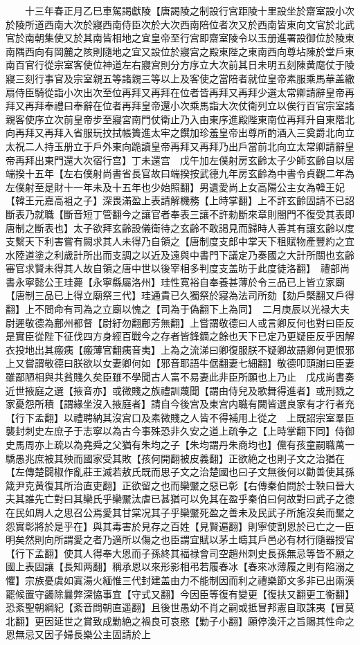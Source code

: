 　　十三年春正月乙巳車駕謁獻陵【唐謁陵之制設行宫距陵十里設坐於齋室設小次於陵所道西南大次於寢西南侍臣次於大次西南陪位者次又於西南皆東向文官於北武官於南朝集使又於其南皆相地之宜皇帝至行宫即齋室陵令以玉册進署設御位於陵東南隅西向有岡麓之陔則隨地之宜又設位於寢宫之殿東陛之東南西向尊坫陳於堂戶東南百官行從宗室客使位神道左右寢宫則分方序立大次前其日未明五刻陳黄麾仗于陵寢三刻行事官及宗室親五等諸親三等以上及客使之當陪者就位皇帝素服乘馬華盖繖扇侍臣騎從詣小次出次至位再拜又再拜在位者皆再拜又再拜少選太常卿請辭皇帝再拜又再拜奉禮曰奉辭在位者再拜皇帝還小次乘馬詣大次仗衛列立以俟行百官宗室諸親客使序立次前皇帝步至寢宮南門仗衛止乃入由東序進殿陛東南位再拜升自東階北向再拜又再拜入省服玩抆拭帳簀進太牢之饌加珍羞皇帝出尊所酌酒入三奠爵北向立太祝二人持玉册立于戶外東向跪讀皇帝再拜又再拜乃出戶當前北向立太常卿請辭皇帝再拜出東門還大次宿行宫】丁未還宫　戊午加左僕射房玄齡太子少師玄齡自以居端揆十五年【左右僕射尚書省長官故曰端揆按武德九年房玄齡為中書令貞觀二年為左僕射至是財十一年未及十五年也少始照翻】男遺愛尚上女高陽公主女為韓王妃【韓王元嘉高袓之子】深畏滿盈上表請解機務【上時掌翻】上不許玄齡固請不已詔斷表乃就職【斷音短丁管翻今之讓官者奉表三讓不許勑斷來章則閤門不復受其表即唐制之斷表也】太子欲拜玄齡設儀衛待之玄齡不敢謁見而歸時人善其有讓玄齡以度支繫天下利害嘗有闕求其人未得乃自領之【唐制度支郎中掌天下租賦物產豐約之宜水陸道塗之利歲計所出而支調之以近及遠與中書門下議定乃奏國之大計所關也玄齡審官求賢未得其人故自領之唐中世以後宰相多判度支盖昉于此度徒洛翻】　禮部尚書永寧懿公王珪薨【永寧縣屬洛州】珪性寛裕自奉養甚薄於令三品已上皆立家廟【唐制三品已上得立廟祭三代】珪通貴已久獨祭於寢為法司所劾【劾戶槩翻又戶得翻】上不問命有司為之立廟以愧之【司為于偽翻下上為同】　二月庚辰以光禄大夫尉遲敬德為鄜州都督【尉紆勿翻鄜芳無翻】上嘗謂敬德曰人或言卿反何也對曰臣反是實臣從陛下征伐四方身經百戰今之存者皆鋒鏑之餘也天下已定乃更疑臣反乎因解衣投地出其瘢痍【瘢薄官翻痍音夷】上為之流涕曰卿復服朕不疑卿故語卿何更恨邪上又嘗謂敬德曰朕欲以女妻卿何如【邪音耶語牛倨翻妻七細翻】敬德叩頭謝曰臣妻雖鄙陋相與共貧賤久矣臣雖不學聞古人富不易妻此非臣所願也上乃止　戊戍尚書奏近世掖庭之選【掖音亦】或微賤之族禮訓蔑聞【謂由侍兒及歌舞得進者】或刑戮之家憂怨所積【謂緣坐沒入掖庭者】請自今後宫及東宫内職有闕皆選良家有才行者充【行下孟翻】以禮聘納其沒宫口及素微賤之人皆不得補用上從之　上既詔宗室羣臣襲封刺史左庶子于志寧以為古今事殊恐非久安之道上疏争之【上時掌翻下同】侍御史馬周亦上疏以為堯舜之父猶有朱均之子【朱均謂丹朱商均也】儻有孩童嗣職萬一驕愚兆庶被其殃而國家受其敗【孩何開翻被皮義翻】正欲絶之也則子文之治猶在【左傳楚闘椒作亂莊王滅若敖氏既而思子文之治楚國也曰子文無後何以勸善使其孫箴尹克黄復其所治直吏翻】正欲留之也而欒黶之惡已彰【右傳秦伯問於士鞅曰晉大夫其誰先亡對曰其欒氏乎欒黶汰虐已甚猶可以免其在盈乎秦伯曰何故對曰武子之德在民如周人之思召公焉愛其甘棠况其子乎欒黶死盈之善未及民武子所施沒矣而黶之怨實彰將於是乎在】與其毒害於見存之百姓【見賢遍翻】則寧使割恩於已亡之一臣明矣然則向所謂愛之者乃適所以傷之也臣謂宜賦以茅土疇其戶邑必有材行隨器授官【行下孟翻】使其人得奉大恩而子孫終其褔禄會司空趙州刺史長孫無忌等皆不願之國上表固讓【長知两翻】稱承恩以來形影相弔若履春冰【春來冰薄履之則有陷溺之懼】宗族憂虞如寘湯火緬惟三代封建盖由力不能制因而利之禮樂節文多非已出兩漢罷候置守蠲除曩弊深恊事宜【守式又翻】今因臣等復有變更【復扶又翻更工衡翻】恐紊聖朝綱紀【紊音問朝直遥翻】且後世愚幼不肖之嗣或抵冒邦憲自取誅夷【冒莫北翻】更因延世之賞致成勦絶之禍良可哀愍【勦子小翻】願停渙汗之旨賜其性命之恩無忌又因子婦長樂公主固請於上